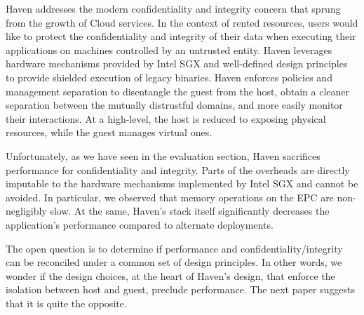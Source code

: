 %
Haven addresses the modern confidentiality and integrity concern that sprung from the growth of Cloud services.
In the context of rented resources, users would like to protect the confidentiality and integrity of their data when executing their applications on machines controlled by an untrusted entity.
Haven leverages hardware mechanisms provided by Intel SGX and well-defined design principles to provide shielded execution of legacy binaries.
Haven enforces policies and management separation to disentangle the guest from the host, obtain a cleaner separation between the mutually distrustful domains, and more easily monitor their interactions.
At a high-level, the host is reduced to exposing physical resources, while the guest manages virtual ones.

Unfortunately, as we have seen in the evaluation section, Haven sacrifices performance for confidentiality and integrity.
Parts of the overheads are directly imputable to the hardware mechanisms implemented by Intel SGX and cannot be avoided.
In particular, we observed that memory operations on the EPC are non-negligibly slow.
At the same, Haven's stack itself significantly decreases the application's performance compared to alternate deployments.

The open question is to determine if performance and confidentiality/integrity can be reconciled under a common set of design principles.
In other words, we wonder if the design choices, at the heart of Haven's design, that enforce the isolation between host and guest, preclude performance.
The next paper suggests that it is quite the opposite.